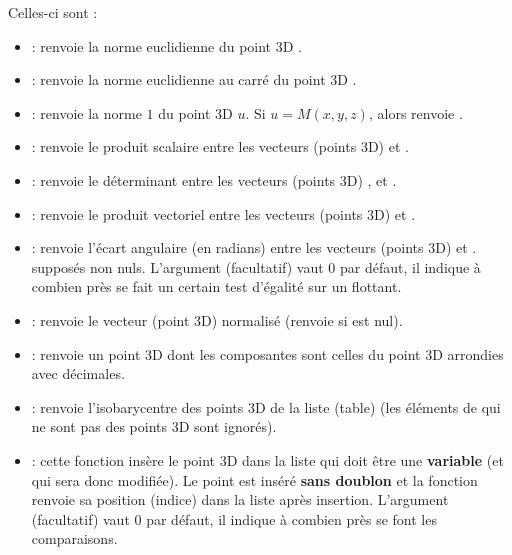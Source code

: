 Celles-ci sont :
\begin{itemize}
    \item {} : renvoie la norme euclidienne du point 3D .
    
    \item {} : renvoie la norme euclidienne au carré du point 3D .
    
    \item {} : renvoie la norme $1$ du point 3D $u$. Si $u=M(x,y,z)$, alors  renvoie .
    
    \item {} : renvoie le produit scalaire entre les vecteurs (points 3D)  et .
    
    \item {} : renvoie le déterminant entre les vecteurs (points 3D) ,  et .
    
    \item {} : renvoie le produit vectoriel entre les vecteurs (points 3D)  et .
    
    \item {} : renvoie l'écart angulaire (en radians) entre les vecteurs (points 3D)  et . supposés non nuls. L'argument (facultatif)  vaut $0$ par défaut, il indique à combien près se fait un certain test d'égalité sur un flottant.
    \item {} : renvoie le vecteur (point 3D)  normalisé (renvoie \nil si  est nul).
    
    \item {} : renvoie un point 3D dont les composantes sont celles du point 3D  arrondies avec  décimales.
    
    \item {} : renvoie l'isobarycentre des points 3D de la liste (table)  (les éléments de  qui ne sont pas des points 3D sont ignorés).
    
    \item {} : cette fonction insère le point 3D  dans la liste  qui doit être une \textbf{variable} (et qui sera donc modifiée). Le point  est inséré \textbf{sans doublon} et la fonction renvoie sa position (indice) dans la liste  après insertion. L'argument (facultatif)  vaut $0$ par défaut, il indique à combien près se font les comparaisons.
\end{itemize}

